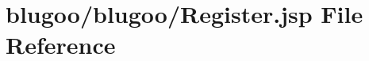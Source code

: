 \hypertarget{Register_8jsp}{
\section{blugoo/blugoo/Register.jsp File Reference}
\label{Register_8jsp}
}


